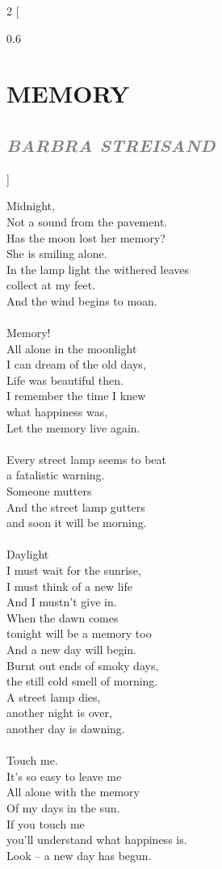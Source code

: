 \documentclass[100pt,a4paper]{report}
\newenvironment{song2}[2]
	{	
    	\begin{multicols*}{2}
		[
			\begin{spacing}{0.6}
				\section*{\LARGE\centering \MakeUppercase{\textbf{{#1}}}}
				\subsection*{\Large\centering \textit{\textcolor{gray}{\MakeUppercase{{#2}}}}}
			\end{spacing}
		]
		\Large
	}
	{
	\end{multicols*}
	\newpage
    }
\begin{document}
\begin{song2}{Memory}{Barbra Streisand}
\noindent
Midnight,\\
Not a sound from the pavement.\\
Has the moon lost her memory?\\
She is smiling alone.\\
In the lamp light the withered leaves\\
collect at my feet.\\
And the wind begins to moan.\\
\\
Memory!\\
All alone in the moonlight\\
I can dream of the old days,\\
Life was beautiful then.\\
I remember the time I knew\\ 
what happiness was,\\
Let the memory live again.\\
\\
Every street lamp seems to beat\\
a fatalistic warning.\\
Someone mutters\\ 
And the street lamp gutters\\
and soon it will be morning.\\
\\
Daylight\\
I must wait for the sunrise,\\
I must think of a new life\\
And I mustn't give in.\\
When the dawn comes\\
tonight will be a memory too\\
And a new day will begin.\\
\vfill
\columnbreak
\noindent
Burnt out ends of smoky days,\\
the still cold smell of morning.\\
A street lamp dies,\\
another night is over,\\
another day is dawning.\\
\\
Touch me.\\
It's so easy to leave me\\
All alone with the memory\\
Of my days in the sun.\\
If you touch me\\
you'll understand what happiness is.\\
Look -- a new day has begun.\\
\end{song2}
\end{document}
